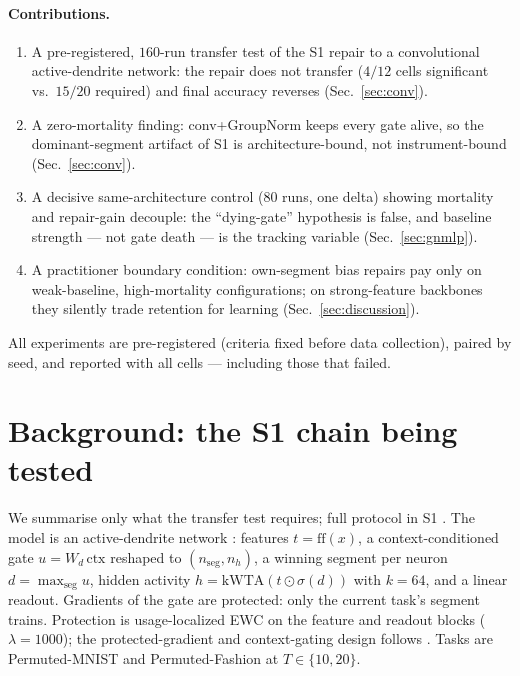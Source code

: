 \documentclass[review]{elsarticle}
\begin{document}
\paragraph{Contributions.}
\begin{enumerate}
\item A pre-registered, $160$-run transfer test of the S1 repair to a
convolutional active-dendrite network: the repair does not transfer
($4/12$ cells significant vs.\ $15/20$ required) and final accuracy
reverses (Sec.~\ref{sec:conv}).
\item A zero-mortality finding: conv+GroupNorm keeps every gate
alive, so the dominant-segment artifact of S1 is architecture-bound,
not instrument-bound (Sec.~\ref{sec:conv}).
\item A decisive same-architecture control ($80$ runs, one delta)
showing mortality and repair-gain decouple: the ``dying-gate''
hypothesis is false, and baseline strength --- not gate death --- is
the tracking variable (Sec.~\ref{sec:gnmlp}).
\item A practitioner boundary condition: own-segment bias repairs pay
only on weak-baseline, high-mortality configurations; on
strong-feature backbones they silently trade retention for learning
(Sec.~\ref{sec:discussion}).
\end{enumerate}

All experiments are pre-registered (criteria fixed before data
collection), paired by seed, and reported with all cells --- including
those that failed.

\section{Background: the S1 chain being tested}
\label{sec:background}

We summarise only what the transfer test requires; full protocol in
S1 \cite{zhou2026delpS1}. The model is an active-dendrite network
\cite{iyer2022}: features $t = \mathrm{ff}(x)$, a context-conditioned
gate $u = W_d\,\mathrm{ctx}$ reshaped to $(n_{\mathrm{seg}}, n_h)$, a
winning segment per neuron $d = \max_{\mathrm{seg}} u$, hidden
activity $h = \mathrm{kWTA}(t \odot \sigma(d))$ with $k{=}64$, and a
linear readout. Gradients of the gate are protected: only the current
task's segment trains. Protection is usage-localized EWC
\cite{kirkpatrick2017} on the
feature and readout blocks ($\lambda{=}1000$); the protected-gradient
and context-gating design follows \cite{iyer2022,masse2018}. Tasks are
Permuted-MNIST and Permuted-Fashion \cite{parisi2019} at $T \in \{10, 20\}$.
\end{document}
